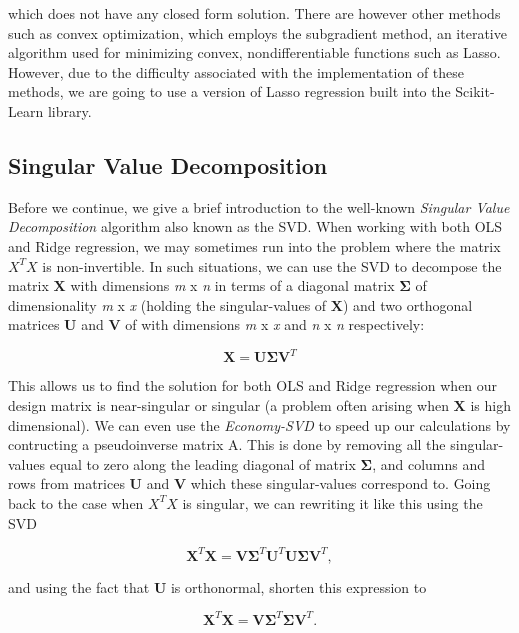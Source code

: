 \documentclass[a4paper, 10pt]{article}
\begin{document}
which does not have any closed form solution. There are however other methods such as convex optimization, which employs the subgradient method, an iterative algorithm used for minimizing convex, nondifferentiable functions such as Lasso. However, due to the difficulty associated with the implementation of these methods, we are going to use a version of Lasso regression built into the Scikit-Learn library.

\subsection{Singular Value Decomposition}
Before we continue, we give a brief introduction to the well-known \emph{Singular Value Decomposition} algorithm also known as the SVD. When working with both OLS and Ridge regression, we may sometimes run into the problem where the matrix $X^TX$ is non-invertible. In such situations, we can use the SVD to decompose the matrix $\boldsymbol{X}$ with dimensions \emph{m} x \emph{n} in terms of a diagonal matrix $\boldsymbol{\Sigma}$ of dimensionality \emph{m} x \emph{x} (holding the singular-values of $\boldsymbol{X}$) and two orthogonal matrices $\boldsymbol{U}$ and $\boldsymbol{V}$ of with dimensions \emph{m} x \emph{x} and \emph{n} x \emph{n} respectively: 

$$
\boldsymbol{X} = \boldsymbol{U}\boldsymbol{\Sigma}\boldsymbol{V}^T
$$

This allows us to find the solution for both OLS and Ridge regression when our design matrix is near-singular or singular (a problem often arising when $\boldsymbol{X}$ is high dimensional). We can even use the \emph{Economy-SVD} to speed up our calculations by contructing a pseudoinverse matrix A. This is done by removing all the singular-values equal to zero along the leading diagonal of matrix $\boldsymbol{\Sigma}$, and columns and rows from matrices $\boldsymbol{U}$ and $\boldsymbol{V}$ which these singular-values correspond to. Going back to the case when $X^TX$ is singular, we can rewriting it like this using the SVD

$$
\boldsymbol{X}^T\boldsymbol{X}=\boldsymbol{V}\boldsymbol{\Sigma}^T\boldsymbol{U}^T\boldsymbol{U}\boldsymbol{\Sigma}\boldsymbol{V}^T,
$$

and using the fact that $\boldsymbol{U}$ is orthonormal, shorten this expression to 

$$
\boldsymbol{X}^T\boldsymbol{X}=\boldsymbol{V}\boldsymbol{\Sigma}^T\boldsymbol{\Sigma}\boldsymbol{V}^T.
$$
\end{document}
